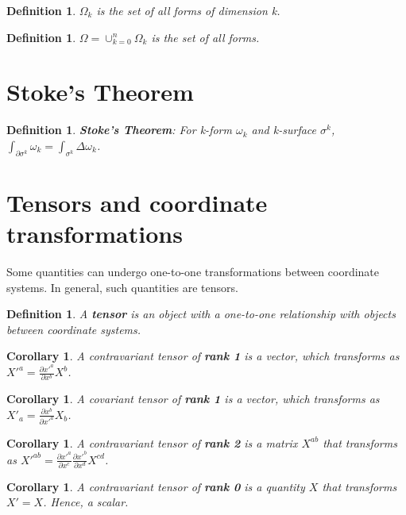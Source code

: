 \documentclass{book}
\newtheorem{defn}[equation]{Definition}
\newtheorem{coro}[equation]{Corollary}
\begin{document}
\begin{defn}
	$\Omega_k$ is the set of all forms of dimension k. 
\end{defn}

\begin{defn}
	$\Omega = \cup_{k=0}^n\Omega_k$ is the set of all forms. 
\end{defn}

\section{Stoke's Theorem}


\begin{defn}
	\textbf{Stoke's Theorem}: For k-form $\omega_k$ and k-surface $\sigma^k$, $\int_{\partial \sigma^k}\omega_k = \int_{\sigma^k}\Delta\omega_k$. 
\end{defn}

\section{Tensors and coordinate transformations}
Some quantities can undergo one-to-one transformations between coordinate systems. In general, such quantities are tensors. 


\begin{defn}
	A \textbf{tensor} is an object with a one-to-one relationship with objects between coordinate systems. 
\end{defn}

\begin{coro}
	A contravariant tensor of \textbf{rank 1} is a vector, which transforms as  $X'^a = \frac{\partial x'^a}{\partial x^b} X^b$.  
\end{coro}

\begin{coro}
	A covariant tensor of \textbf{rank 1} is a vector, which transforms as $X'_a = \frac{\partial x^b}{\partial x'^a} X_b$. 
\end{coro}

\begin{coro}
	A contravariant tensor of \textbf{rank 2} is a matrix $X^{ab}$ that transforms as $X'^{ab} = \frac{\partial x'^a}{\partial x^c} \frac{\partial x'^b}{\partial x^d} X^{cd}$. 
\end{coro}

\begin{coro}
	A contravariant tensor of \textbf{rank 0} is a quantity $X$ that transforms $X' = X$. Hence, a scalar. 
\end{coro}
\end{document}

